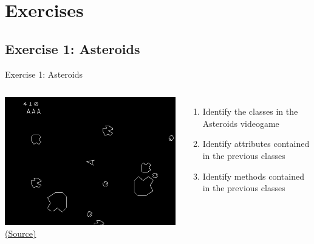 \documentclass[10pt,compress]{beamer} %
\begin{document}
\section{Exercises}
\subsection{Exercise 1: Asteroids}
	\begin{frame}{Exercise 1: Asteroids}
	\vspace{-0.3cm}
    \begin{columns}
		\centering \includegraphics[width=\linewidth]{figs/asteroids.png}\\
		\tiny{\href{http://gamedevelopment.tutsplus.com/tutorials/quick-tip-intro-to-object-oriented-programming-for-game-development--gamedev-1805}{(Source)}}
	\begin{enumerate}
	\item Identify the classes in the Asteroids videogame
	\item Identify attributes contained in the previous classes
	\item Identify methods contained in the previous classes
	\end{enumerate}
	\end{columns}
\end{frame}
\end{document}
